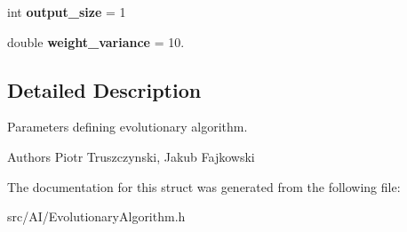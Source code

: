\begin{DoxyCompactItemize}
\item 
int {\bfseries output\+\_\+size} = 1\hypertarget{structEvolutionaryAlgorithmParameters_a06719c096da6b87af5cb0ce483ac7d37}{}\label{structEvolutionaryAlgorithmParameters_a06719c096da6b87af5cb0ce483ac7d37}

\item 
double {\bfseries weight\+\_\+variance} = 10.\hypertarget{structEvolutionaryAlgorithmParameters_a01dc5d032fa8468a2e5fc2ee33166263}{}\label{structEvolutionaryAlgorithmParameters_a01dc5d032fa8468a2e5fc2ee33166263}

\end{DoxyCompactItemize}


\subsection{Detailed Description}
Parameters defining evolutionary algorithm. 

\begin{DoxyAuthor}{Authors}
Piotr Truszczynski, Jakub Fajkowski 
\end{DoxyAuthor}


The documentation for this struct was generated from the following file\+:\begin{DoxyCompactItemize}
\item 
src/\+A\+I/Evolutionary\+Algorithm.\+h\end{DoxyCompactItemize}
